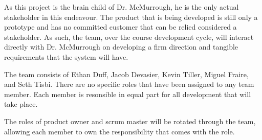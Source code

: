 As this project is the brain child of Dr. McMurrough, he is the only actual stakeholder in this endeavour. The product that is being developed is still only a prototype and has no committed customer that can be relied considered a stakeholder. As such, the team, over the course development cycle, will interact directly with Dr. McMurrough on developing a firm direction and tangible requirements that the system will have. 

The team consists of Ethan Duff, Jacob Devasier, Kevin Tiller, Miguel Fraire, and Seth Tisbi. There are no specific roles that have been assigned to any team member. Each member is resonsible in equal part for all development that will take place.

The roles of product owner and scrum master will be rotated through the team, allowing each member to own the responsibility that comes with the role.